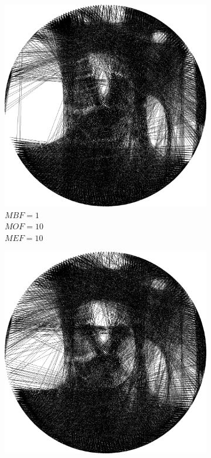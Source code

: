 \begin{figure}[H]
\begin{subfigure}{0.32\textwidth}
        \includegraphics[width = \textwidth]{img/4-mine/taco-thread/taco_e_i3000_c20_inv0_bg1_obj10_ed10.png}
        \caption{\(MBF = 1\) \\ \(MOF = 10\) \\ \(MEF = 10\)}
        \label{mine-param-taco-thread-g}
    \end{subfigure}
    \begin{subfigure}{0.32\textwidth}
        \centering
        \includegraphics[width = \textwidth]{img/4-mine/taco-thread/taco_e_i3000_c20_inv0_bg10_obj1_ed10.png}

\end{subfigure}
\end{figure}
